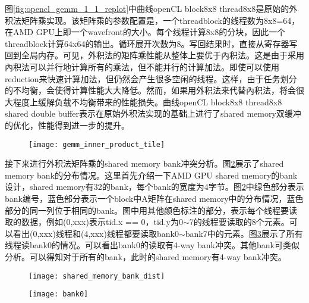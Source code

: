 图\ref{fig:opencl_gemm_1_1_replot}中曲线openCL block8x8 thread8x8是原始的外积法矩阵乘实现。该矩阵乘的参数配置是，一个threadblock的线程数为8x8=64，在AMD GPU上即一个wavefront的大小。每个线程计算8x8的分块，因此一个threadblock计算64x64的输出。循环展开次数为8。写回结果时，直接从寄存器写回到全局内存。可见，外积法的矩阵乘性能从整体上要优于內积法。这是由于采用內积法可以并行地计算所有的乘法，但不能并行的计算加法。即使可以使用reduction来快速计算加法，但仍然会产生很多空闲的线程。这样，由于任务划分的不均衡，会使得计算性能大大降低。然而，如果用外积法来代替內积法，将会很大程度上缓解负载不均衡带来的性能损失。曲线openCL block8x8 thread8x8 shared double buffer表示在原始外积法实现的基础上进行了shared memory双缓冲的优化，性能得到进一步的提升。

\begin{figure}[htbp]
	\centering
	\texttt{[image: gemm\_inner\_product\_tile]}
	\label{fig:gemm_inner_product_tile}
\end{figure}

接下来进行外积法矩阵乘的shared memory bank冲突分析。图\ref{fig:shared_memory_bank_dist}展示了shared memory bank的分布情况。这里首先介绍一下AMD GPU shared memory的bank设计，shared memory有32的bank，每个bank的宽度为4字节。图\ref{fig:shared_memory_bank_dist}中绿色部分表示bank编号，蓝色部分表示一个block中A矩阵在shared memory中的分布情况，蓝色部分的同一列位于相同的bank。图中用其他颜色标注的部分，表示每个线程要读取的数据，例如(0,xxx)表示tid.x == 0，tid.y为0$\sim$7的线程要读取的8个元素。可以看出(0,xxx)线程和(4,xxx)线程都要读取bank0$\sim$bank7中的元素。图\ref{fig:bank0}展示了所有线程读bank0的情况。可以看出bank0的读取有4-way bank冲突。其他bank可类似分析。可以得知对于所有的bank，此时的shared memory有4-way bank冲突。



\begin{figure}[htbp]
	\centering
	\texttt{[image: shared\_memory\_bank\_dist]}
	\label{fig:shared_memory_bank_dist}
\end{figure}

\begin{figure}[htbp]
	\centering
	\texttt{[image: bank0]}
	\label{fig:bank0}
\end{figure}

